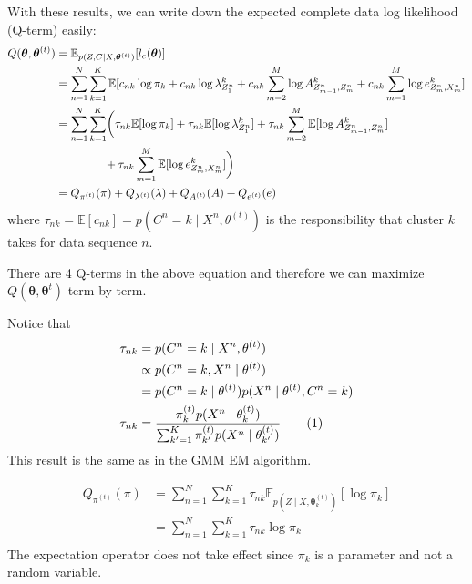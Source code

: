 \documentclass[12pt]{article}
\newcommand\numberthis{\addtocounter{equation}{1}\tag{\theequation}}
\newenvironment{problem}[2][Problem]{\begin{trivlist}
\item[\hskip \labelsep {\bfseries #1}\hskip \labelsep {\bfseries #2.}]}{\end{trivlist}}
\begin{document}
\begin{problem}{2.7.21}
With these results, we can write down the expected complete data log likelihood
(Q-term) easily:
\begin{align*}
    Q(\bm{\theta}, \bm{\theta}^{(t)}) 
    &= \mathbb{E}_{p(Z, C\mid X, \bm{\theta}^{(t)})}[l_c(\bm{\theta})]\\
    &= \sum_{n=1}^{N}  \sum_{k=1}^{K} \mathbb{E}[
            c_{nk}\log \pi_k + c_{nk} \log \lambda^k_{Z^n_1}
            + c_{nk} \sum_{m=2}^{M} \log A^k_{Z^n_{m-1},Z^n_m}
            + c_{nk} \sum_{m=1}^{M} \log e^k_{Z^n_{m},X^n_m}
            ]\\
    &= \sum_{n=1}^{N} \sum_{k=1}^{K} \biggl(
            \tau_{nk} \mathbb{E}[\log \pi_k] 
            + \tau_{nk} \mathbb{E}[\log \lambda^k_{Z^n_1}]
            + \tau_{nk} \sum_{m=2}^{M} \mathbb{E}[\log A^k_{Z^n_{m-1},Z^n_m}] \\
            & \hspace{1.5cm} 
            + \tau_{nk} \sum_{m=1}^{M} \mathbb{E}[\log e^k_{Z^n_{m},X^n_m}]
            \biggl)\\
    &= Q_{\pi^{(t)}}(\pi) + Q_{\lambda^{(t)}}(\lambda) + Q_{A^{(t)}}(A) + Q_{e^{(t)}}(e)
\end{align*}
where $\tau_{nk} = \mathbb{E}[c_{nk}] = p(C^n = k \mid X^n, \theta^{(t)})$ is the
responsibility that cluster $k$ takes for data sequence $n$.

There are 4 Q-terms in the above equation and therefore we can maximize 
$Q(\bm{\theta}, \bm{\theta}^{t})$ term-by-term.

Notice that
\begin{align*}
    \tau_{nk} &= p(C^n = k \mid X^n, \theta^{(t)})  \\
    & \propto p(C^n = k, X^n \mid \theta^{(t)}) \\
    & = p(C^n = k\mid \theta^{(t)})p(X^n \mid \theta^{(t)}, C^n = k) \\
    \tau_{nk}
    &= \frac{\pi_k^{(t)} p(X^n \mid \theta^{(t)}_k)}
            {\sum_{k'=1}^{K}\pi_{k'}^{(t)} p(X^n \mid \theta^{(t)}_{k'})}
        \numberthis \label{eq:Q27_tau}
\end{align*}
This result is the same as in the GMM EM algorithm.

\begin{align*}
    Q_{\pi^{(t)}}(\pi) &= \sum_{n=1}^{N} \sum_{k=1}^{K}
        \tau_{nk} \mathbb{E}_{p(Z\mid X, \bm{\theta}^{(t)}_k)}[\log \pi_k]  \\
    &=  \sum_{n=1}^{N} \sum_{k=1}^{K} 
        \tau_{nk} \log \pi_k\\
\end{align*}
The expectation operator does not take effect since $\pi_k$ is a parameter and 
not a random variable.


\end{problem}
\end{document}
